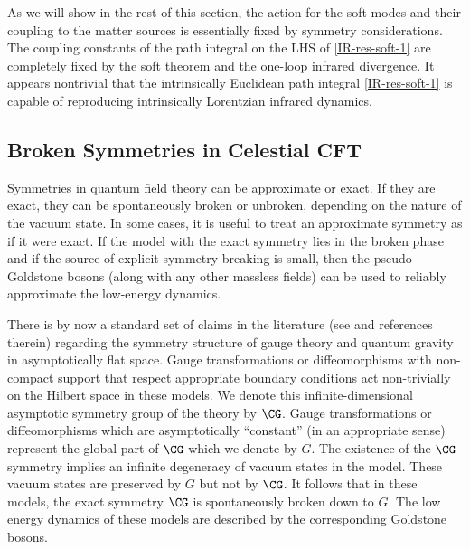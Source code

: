 \documentclass[11pt]{article}
\begin{document}
As we will show in the rest of this section, the action for the soft modes and their coupling to the matter sources is essentially fixed by symmetry considerations. The coupling constants of the path integral on the LHS of \eqref{IR-res-soft-1} are completely fixed by the soft theorem and the one-loop infrared divergence. It appears nontrivial that the intrinsically Euclidean path integral \eqref{IR-res-soft-1} is capable of reproducing intrinsically Lorentzian infrared dynamics. 





\subsection{Broken Symmetries in Celestial CFT}

	
Symmetries in quantum field theory can be approximate or exact. If they are exact, they can be spontaneously broken or unbroken, depending on the nature of the vacuum state. In some cases, it is useful to treat an approximate symmetry as if it were exact. If the model with the exact symmetry lies in the broken phase and if the source of explicit symmetry breaking is small, then the pseudo-Goldstone bosons (along with any other massless fields) can be used to reliably approximate the low-energy dynamics.



There is by now a standard set of claims in the literature (see \cite{Strominger:2017zoo} and references therein) regarding the symmetry structure of gauge theory and quantum gravity in asymptotically flat space. Gauge transformations or diffeomorphisms with non-compact support that respect appropriate boundary conditions act non-trivially on the Hilbert space in these models. We denote this infinite-dimensional asymptotic symmetry group of the theory by $\CG$. Gauge transformations or diffeomorphisms which are asymptotically ``constant'' (in an appropriate sense) represent the global part of $\CG$ which we denote by $G$. The existence of the $\CG$ symmetry implies an infinite degeneracy of vacuum states in the model. These vacuum states are preserved by $G$ but not by $\CG$. It follows that in these models, the exact symmetry $\CG$ is spontaneously broken down to $G$. The low energy dynamics of these models are described by the corresponding Goldstone bosons.
 
\end{document}
